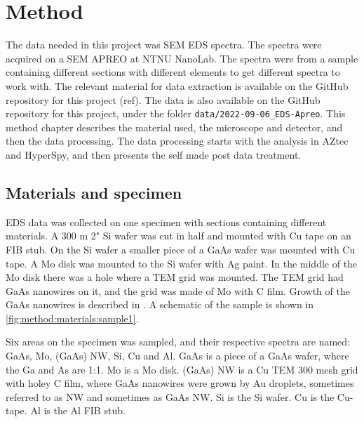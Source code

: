\chapter{Method}
\label{chap:method}




The data needed in this project was SEM EDS spectra.
The spectra were acquired on a SEM APREO at NTNU NanoLab.
The spectra were from a sample containing different sections with different elements to get different spectra to work with.
The relevant material for data extraction is available on the GitHub repository for this project (ref).
The data is also available on the GitHub repository for this project, under the folder \verb|data/2022-09-06_EDS-Apreo|.
This method chapter describes the material used, the microscope and detector, and then the data processing.
The data processing starts with the analysis in AZtec and HyperSpy, and then presents the self made post data treatment.



%
%
\section{Materials and specimen}
\label{sec:method:materials}
EDS data was collected on one specimen with sections containing different materials.
A 300 \textmu m 2" Si wafer was cut in half and mounted with Cu tape on an FIB stub.
On the Si wafer a smaller piece of a GaAs wafer was mounted with Cu tape.
A Mo disk was mounted to the Si wafer with Ag paint.
In the middle of the Mo disk there was a hole where a TEM grid was mounted.
The TEM grid had GaAs nanowires on it, and the grid was made of Mo with C film.
Growth of the GaAs nanowires is described in \cite[Ch. 3]{skomedal_improving_2022}.
A schematic of the sample is shown in \cref{fig:method:materials:sample1}.

Six areas on the specimen was sampled, and their respective spectra are named: GaAs, Mo, (GaAs) NW, Si, Cu and Al.
GaAs is a piece of a GaAs wafer, where the Ga and As are 1:1.
Mo is a Mo disk.
(GaAs) NW is a Cu TEM 300 mesh grid with holey C film, where GaAs nanowires were grown by Au droplets, sometimes referred to as NW and sometimes as GaAs NW.
Si is the Si wafer.
Cu is the Cu-tape.
Al is the Al FIB stub.



